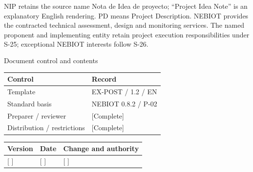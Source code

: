 \vspace{2mm}
NIP retains the source name Nota de Idea de proyecto; “Project Idea Note” is an explanatory English rendering. PD means Project Description.
\vspace{2mm}
NEBIOT provides the contracted technical assessment, design and monitoring services. The named proponent and implementing entity retain project execution responsibilities under S-25; exceptional NEBIOT interests follow S-26.
\clearpage
{\fontsize{23}{27}\selectfont\color{NEBGreen}Document control and contents\par}
\vspace{3mm}
{\sffamily\fontsize{8.3}{10.3}\selectfont\begin{longtable}{@{}P{50.55mm} P{117.94mm}@{}}
\toprule
\textbf{Control} & \textbf{Record}\\\midrule\endhead
\rule{0pt}{7.7mm}Template & EX-POST / 1.2 / EN\\\hline
\rule{0pt}{7.7mm}Standard basis & NEBIOT 0.8.2 / P-02\\\hline
\rule{0pt}{7.7mm}Preparer / reviewer & [Complete]\\\hline
\rule{0pt}{7.7mm}Distribution / restrictions & [Complete]\\\hline
\end{longtable}}
{\sffamily\fontsize{8.3}{10.3}\selectfont\begin{longtable}{@{}P{31.34mm} P{37.94mm} P{95.68mm}@{}}
\toprule
\textbf{Version} & \textbf{Date} & \textbf{Change and authority}\\\midrule\endhead
\rule{0pt}{7.7mm}[ ] & [ ] & [ ]\\\hline
\end{longtable}}
{\sffamily\fontsize{9.5}{11.4}\selectfont\tableofcontents}

